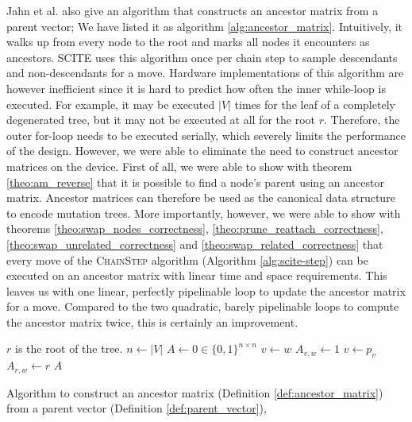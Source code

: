 Jahn et al. \cite{tree2016} also give an algorithm that constructs an ancestor matrix from a parent vector; We have listed it as algorithm \ref{alg:ancestor_matrix}. Intuitively, it walks up from every node to the root and marks all nodes it encounters as ancestors. \ac{SCITE} uses this algorithm once per chain step to sample descendants and non-descendants for a move. Hardware implementations of this algorithm are however inefficient since it is hard to predict how often the inner while-loop is executed. For example, it may be executed $|V|$ times for the leaf of a completely degenerated tree, but it may not be executed at all for the root $r$. Therefore, the outer for-loop needs to be executed serially, which severely limits the performance of the design. However, we were able to eliminate the need to construct ancestor matrices on the device. First of all, we were able to show with theorem \ref{theo:am_reverse} that it is possible to find a node's parent using an ancestor matrix. Ancestor matrices can therefore be used as the canonical data structure to encode mutation trees. More importantly, however, we were able to show with theorems \ref{theo:swap_nodes_correctness}, \ref{theo:prune_reattach_correctness}, \ref{theo:swap_unrelated_correctness} and \ref{theo:swap_related_correctness} that every move of the \textsc{ChainStep} algorithm (Algorithm \ref{alg:scite-step}) can be executed on an ancestor matrix with linear time and space requirements. This leaves us with one linear, perfectly pipelinable loop to update the ancestor matrix for a move. Compared to the two quadratic, barely pipelinable loops to compute the ancestor matrix twice, this is certainly an improvement.

\begin{algorithm}
    \begin{algorithmic}[1]
         \Comment $r$ is the root of the tree.
            \State $n \leftarrow |V|$
            \State $A \leftarrow 0 \in \{0,1\}^{n \times n}$
                \State $v \leftarrow w$
                    \State $A_{v, w} \leftarrow 1$
                    \State $v \leftarrow p_v$
                \EndWhile
                \State $A_{r, w} \leftarrow r$
            \EndFor
            \State \Return $A$
        \EndFunction
    \end{algorithmic}
    \caption{Algorithm to construct an ancestor matrix (Definition \ref{def:ancestor_matrix}) from a parent vector (Definition \ref{def:parent_vector}), \cite{tree2016}}
    \label{alg:ancestor_matrix}
\end{algorithm}

